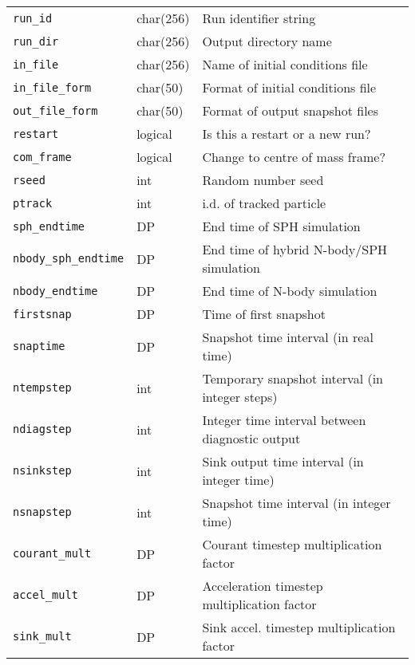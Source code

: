\documentclass[a4paper]{article}
\newcommand{\var}[1]{\texttt{#1}}
\begin{document}
\begin{center}
\begin{supertabular}{|p{3cm}|p{2cm}|p{8cm}|}

\var{run\_id}    & char(256) & Run identifier string \\
\var{run\_dir}   & char(256) & Output directory name \\
\var{in\_file}   & char(256) & Name of initial conditions file \\
\var{in\_file\_form}  & char(50) & Format of initial conditions file \\
\var{out\_file\_form} & char(50) & Format of output snapshot files \\ \hline
\var{restart}    & logical  & Is this a restart or a new run? \\ 
\var{com\_frame} & logical  & Change to centre of mass frame? \\
\var{rseed}      & int      & Random number seed \\
\var{ptrack}     & int      & i.d. of tracked particle \\ \hline
\var{sph\_endtime}    & DP  & End time of SPH simulation \\
\var{nbody\_sph\_endtime} & DP & End time of hybrid N-body/SPH simulation \\
\var{nbody\_endtime} & DP   & End time of N-body simulation \\
\var{firstsnap}  & DP       & Time of first snapshot \\
\var{snaptime}   & DP       & Snapshot time interval (in real time) \\
\var{ntempstep}  & int      & Temporary snapshot interval (in integer steps) \\
\var{ndiagstep}  & int      & Integer time interval between diagnostic output \\
\var{nsinkstep}  & int      & Sink output time interval (in integer time) \\ 
\var{nsnapstep}  & int      & Snapshot time interval (in integer time) \\
\var{courant\_mult} & DP    & Courant timestep multiplication factor \\
\var{accel\_mult} & DP      & Acceleration timestep multiplication factor \\
\var{sink\_mult} & DP       & Sink accel. timestep multiplication factor \\

\end{supertabular}
\end{center}
\end{document}
